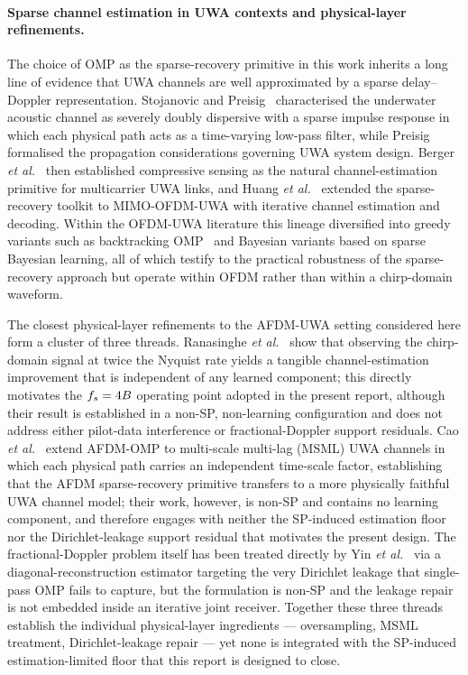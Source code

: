 \paragraph{Sparse channel estimation in UWA contexts and physical-layer
refinements.}
The choice of OMP as the sparse-recovery primitive in this work inherits a
long line of evidence that UWA channels are well approximated by a sparse
delay--Doppler representation. Stojanovic and
Preisig~\cite{stojanovic2009uwa} characterised the underwater acoustic
channel as severely doubly dispersive with a sparse impulse response in
which each physical path acts as a time-varying low-pass filter, while
Preisig~\cite{preisig2007uwa} formalised the propagation considerations
governing UWA system design. Berger \emph{et al.}~\cite{berger2010uwasparse}
then established compressive sensing as the natural channel-estimation
primitive for multicarrier UWA links, and Huang \emph{et
al.}~\cite{huang2010uwamimoofdm} extended the sparse-recovery toolkit to
MIMO-OFDM-UWA with iterative channel estimation and decoding. Within the
OFDM-UWA literature this lineage diversified into greedy variants such as
backtracking OMP~\cite{junejo2018labomp} and Bayesian variants based on
sparse Bayesian learning, all of which testify to the practical robustness
of the sparse-recovery approach but operate within OFDM rather than within a
chirp-domain waveform.

The closest physical-layer refinements to the AFDM-UWA setting considered
here form a cluster of three threads. Ranasinghe \emph{et
al.}~\cite{ma2024oversampledafdm} show that observing the chirp-domain signal
at twice the Nyquist rate yields a tangible channel-estimation improvement
that is independent of any learned component; this directly motivates the
$f_s = 4B$ operating point adopted in the present report, although their
result is established in a non-SP, non-learning configuration and does not
address either pilot-data interference or fractional-Doppler support
residuals. Cao \emph{et al.}~\cite{zhou2024msmlafdm} extend AFDM-OMP to
multi-scale multi-lag (MSML) UWA channels in which each physical path
carries an independent time-scale factor, establishing that the AFDM
sparse-recovery primitive transfers to a more physically faithful UWA
channel model; their work, however, is non-SP and contains no learning
component, and therefore engages with neither the SP-induced estimation
floor nor the Dirichlet-leakage support residual that motivates the present
design. The fractional-Doppler problem itself has been treated directly by
Yin \emph{et al.}~\cite{yin2024drceafdm} via a diagonal-reconstruction
estimator targeting the very Dirichlet leakage that single-pass OMP fails to
capture, but the formulation is non-SP and the leakage repair is not
embedded inside an iterative joint receiver. Together these three threads
establish the individual physical-layer ingredients --- oversampling, MSML
treatment, Dirichlet-leakage repair --- yet none is integrated with the
SP-induced estimation-limited floor that this report is designed to close.

